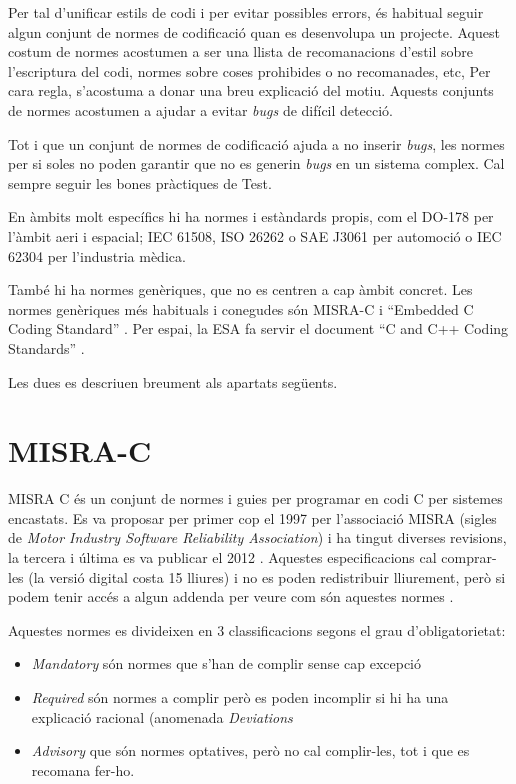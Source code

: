 Per tal d'unificar estils de codi i per evitar possibles errors, és habitual seguir algun conjunt de normes de codificació quan es desenvolupa un projecte. Aquest costum de normes acostumen a ser una llista de recomanacions d'estil sobre l'escriptura del codi, normes sobre coses prohibides o no recomanades, etc, Per cara regla, s'acostuma a donar una breu explicació del motiu. Aquests conjunts de normes acostumen a ajudar a evitar {\em bugs} de difícil detecció.

\begin{remark}
Tot i que un conjunt de normes de codificació ajuda a no inserir {\em bugs}, les normes per si soles no poden garantir que no es generin {\em bugs} en un sistema complex. Cal sempre seguir les bones pràctiques de Test.%
\end{remark}

En àmbits molt específics hi ha normes i estàndards propis, com el DO-178 per l'àmbit aeri i espacial; IEC 61508, ISO 26262 o SAE J3061 per automoció o IEC 62304 per l'industria mèdica.

També hi ha normes genèriques, que no es centren a cap àmbit concret. Les normes genèriques més habituals i conegudes són MISRA-C \cite{MISRAHomepage} i ``Embedded C Coding Standard'' \cite{BARRGuidelines}. Per espai, la \gls{ESA} fa servir el document  ``C and C++ Coding Standards'' \cite{BSSC}.

Les dues es descriuen breument als apartats següents.

\section{MISRA-C}
\label{sec:MISRA}
MISRA C és un conjunt de normes i guies per programar en codi C per sistemes encastats. Es va proposar per primer cop el 1997 per l'associació MISRA (sigles de {\em Motor Industry Software Reliability Association}) i ha tingut diverses revisions, la tercera i última es va publicar el 2012 \cite{MISRAHomepage}\cite{MISRAC2012}.
Aquestes especificacions cal comprar-les (la versió digital costa 15 lliures) i no es poden redistribuir lliurement, però si podem tenir accés a algun addenda per veure com són aquestes normes \cite{MISRAAmend}.

Aquestes normes es divideixen en 3 classificacions segons el grau d'obligatorietat:
\begin{itemize}
 \item {\em Mandatory} són normes que s'han de complir sense cap excepció
 \item {\em Required} són normes a complir però es poden incomplir si hi ha una explicació racional (anomenada {\em Deviations}
 \item {\em Advisory} que són normes optatives, però no cal complir-les, tot i que es recomana fer-ho.
\end{itemize}

